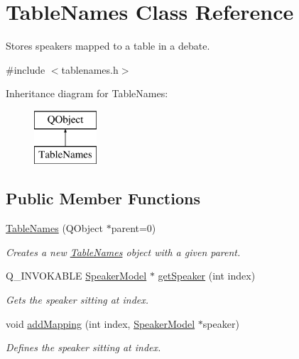 \hypertarget{classTableNames}{\section{Table\-Names Class Reference}
\label{classTableNames}
}


Stores speakers mapped to a table in a debate.  




{\ttfamily \#include $<$tablenames.\-h$>$}

Inheritance diagram for Table\-Names\-:\begin{figure}[H]
\begin{center}
\leavevmode
\includegraphics[height=2.000000cm]{classTableNames}
\end{center}
\end{figure}
\subsection*{Public Member Functions}
\begin{DoxyCompactItemize}
\item 
\hypertarget{classTableNames_a8c8d9e635a104088b62c26734084d760}{\hyperlink{classTableNames_a8c8d9e635a104088b62c26734084d760}{Table\-Names} (Q\-Object $\ast$parent=0)}\label{classTableNames_a8c8d9e635a104088b62c26734084d760}

\begin{DoxyCompactList}\small\item\em Creates a new {\ttfamily \hyperlink{classTableNames}{Table\-Names}} object with a given parent. \end{DoxyCompactList}\item 
\hypertarget{classTableNames_a996257dd574af5f4381f1295d2b8eb15}{Q\-\_\-\-I\-N\-V\-O\-K\-A\-B\-L\-E \hyperlink{classSpeakerModel}{Speaker\-Model} $\ast$ \hyperlink{classTableNames_a996257dd574af5f4381f1295d2b8eb15}{get\-Speaker} (int index)}\label{classTableNames_a996257dd574af5f4381f1295d2b8eb15}

\begin{DoxyCompactList}\small\item\em Gets the speaker sitting at {\ttfamily index}. \end{DoxyCompactList}\item 
\hypertarget{classTableNames_a66a67aef763ec356e52382061bd1f1a1}{void \hyperlink{classTableNames_a66a67aef763ec356e52382061bd1f1a1}{add\-Mapping} (int index, \hyperlink{classSpeakerModel}{Speaker\-Model} $\ast$speaker)}\label{classTableNames_a66a67aef763ec356e52382061bd1f1a1}

\begin{DoxyCompactList}\small\item\em Defines the speaker sitting at {\ttfamily index}. \end{DoxyCompactList}\end{DoxyCompactItemize}


